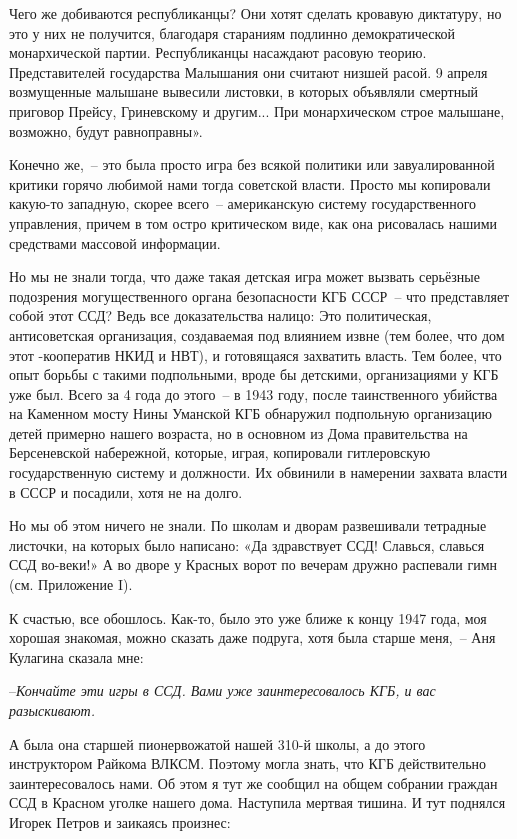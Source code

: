 Чего же добиваются республиканцы? Они хотят сделать кровавую диктатуру, но это у них не получится, благодаря стараниям подлинно демократической монархической партии. Республиканцы насаждают расовую теорию. Представителей государства Малышания они считают низшей расой. 9 апреля возмущенные малышане вывесили листовки, в которых объявляли смертный приговор Прейсу, Гриневскому и другим... При монархическом строе малышане, возможно, будут равноправны».

Конечно же,~-- это была просто игра без всякой политики или завуалированной критики горячо любимой нами тогда советской власти. Просто мы копировали какую-то западную, скорее всего~-- американскую систему государственного управления, причем в том остро критическом виде, как она рисовалась нашими средствами массовой информации.

Но мы не знали тогда, что даже такая детская игра может вызвать серьёзные подозрения могущественного органа безопасности КГБ СССР~-- что представляет собой этот ССД? Ведь все доказательства налицо: Это политическая, антисоветская организация, создаваемая под влиянием извне (тем более, что дом этот -кооператив НКИД и НВТ), и готовящаяся захватить власть. Тем более, что опыт борьбы с такими подпольными, вроде бы детскими, организациями у КГБ уже был. Всего за 4 года до этого~-- в 1943 году, после таинственного убийства на Каменном мосту Нины Уманской КГБ обнаружил подпольную организацию детей примерно нашего возраста, но в основном из Дома правительства на Берсеневской набережной, которые, играя, копировали гитлеровскую государственную систему и должности. Их обвинили в намерении захвата власти в СССР и посадили, хотя не на долго.

Но мы об этом ничего не знали. По школам и дворам развешивали тетрадные листочки, на которых было написано: «Да здравствует ССД! Славься, славься ССД во-веки!» А во дворе у Красных ворот по вечерам дружно распевали гимн (см. Приложение I).

К счастью, все обошлось. Как-то, было это уже ближе к концу 1947 года, моя хорошая знакомая, можно сказать даже подруга, хотя была старше меня,~-- Аня Кулагина сказала мне:

--\textit{Кончайте эти игры в ССД. Вами уже заинтересовалось КГБ, и вас разыскивают.}

А была она старшей пионервожатой нашей 310-й школы, а до этого инструктором Райкома ВЛКСМ. Поэтому могла знать, что КГБ действительно заинтересовалось нами. Об этом я тут же сообщил на общем собрании граждан ССД в Красном уголке нашего дома. Наступила мертвая тишина. И тут поднялся Игорек Петров и заикаясь произнес:

